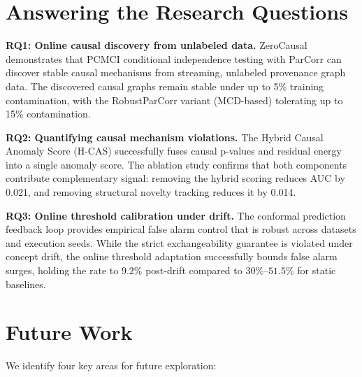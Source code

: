 \section{Answering the Research Questions}

\textbf{RQ1: Online causal discovery from unlabeled data.} ZeroCausal demonstrates that PCMCI conditional independence testing with ParCorr can discover stable causal mechanisms from streaming, unlabeled provenance graph data. The discovered causal graphs remain stable under up to 5\% training contamination, with the RobustParCorr variant (MCD-based) tolerating up to 15\% contamination.

\textbf{RQ2: Quantifying causal mechanism violations.} The Hybrid Causal Anomaly Score (H-CAS) successfully fuses causal p-values and residual energy into a single anomaly score. The ablation study confirms that both components contribute complementary signal: removing the hybrid scoring reduces AUC by 0.021, and removing structural novelty tracking reduces it by 0.014.

\textbf{RQ3: Online threshold calibration under drift.} The conformal prediction feedback loop provides empirical false alarm control that is robust across datasets and execution seeds. While the strict exchangeability guarantee is violated under concept drift, the online threshold adaptation successfully bounds false alarm surges, holding the rate to $9.2\%$ post-drift compared to $30\%$--$51.5\%$ for static baselines.

\section{Future Work}

We identify four key areas for future exploration:

